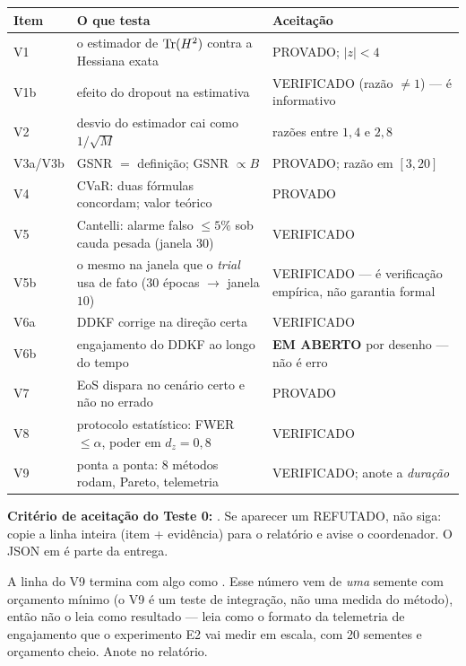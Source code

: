 \begin{center}\small
\begin{tabular}{@{}lp{6.2cm}p{5.6cm}@{}}
\toprule
Item & O que testa & Aceitação \\ \midrule
V1 & o estimador de $\operatorname{Tr}(H^2)$ contra a Hessiana exata & PROVADO; $|z|<4$ \\
V1b & efeito do dropout na estimativa & VERIFICADO (razão $\ne1$) --- é informativo \\
V2 & desvio do estimador cai como $1/\sqrt M$ & razões entre $1{,}4$ e $2{,}8$ \\
V3a/V3b & GSNR $=$ definição; GSNR $\propto B$ & PROVADO; razão em $[3,20]$ \\
V4 & CVaR: duas fórmulas concordam; valor teórico & PROVADO \\
V5 & Cantelli: alarme falso $\le5\%$ sob cauda pesada (janela $30$) & VERIFICADO \\
V5b & o mesmo na janela que o \emph{trial} usa de fato ($30$ épocas $\to$ janela $10$) & VERIFICADO --- é verificação empírica, não garantia formal \\
V6a & DDKF corrige na direção certa & VERIFICADO \\
V6b & engajamento do DDKF ao longo do tempo & \textbf{EM ABERTO} por desenho --- não é erro \\
V7 & EoS dispara no cenário certo e não no errado & PROVADO \\
V8 & protocolo estatístico: FWER $\le\alpha$, poder em $d_z=0{,}8$ & VERIFICADO \\
V9 & ponta a ponta: 8 métodos rodam, Pareto, telemetria & VERIFICADO; anote a \emph{duração} \\
\bottomrule
\end{tabular}
\end{center}

\textbf{Critério de aceitação do Teste 0:} . Se aparecer um REFUTADO, não siga: copie a linha inteira (item + evidência) para o relatório e avise o coordenador. O JSON em  é parte da entrega.

\begin{ideia}
A linha do V9 termina com algo como . Esse número vem de \emph{uma} semente com orçamento mínimo (o V9 é um teste de integração, não uma medida do método), então não o leia como resultado --- leia como o formato da telemetria de engajamento que o experimento E2 vai medir em escala, com 20 sementes e orçamento cheio. Anote no relatório.
\end{ideia}

